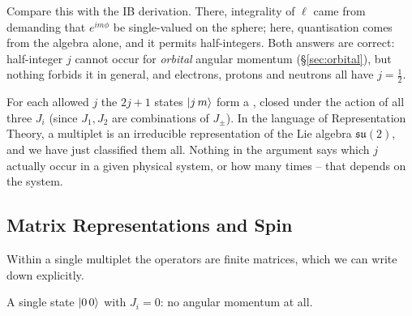 \documentclass[a4paper]{scrartcl}
\begin{document}
Compare this with the IB derivation. There, integrality of $\ell$ came from demanding that $e^{im\phi}$ be single-valued on the sphere; here, quantisation comes from the algebra alone, and it permits half-integers. Both answers are correct: half-integer $j$ cannot occur for \emph{orbital} angular momentum (\S\ref{sec:orbital}), but nothing forbids it in general, and electrons, protons and neutrons all have $j = \frac12$.

\begin{center}
\end{center}

For each allowed $j$ the $2j+1$ states $\ket{j\,m}$ form a , closed under the action of all three $J_i$ (since $J_1, J_2$ are combinations of $J_\pm$). In the language of Representation Theory, a multiplet is an irreducible representation of the Lie algebra $\mathfrak{su}(2)$, and we have just classified them all. Nothing in the argument says which $j$ actually occur in a given physical system, or how many times -- that depends on the system.

\subsection{Matrix Representations and Spin}

Within a single multiplet the operators are finite matrices, which we can write down explicitly.

\begin{example}[$j = 0$]
    A single state $\ket{0\,0}$ with $J_i = 0$: no angular momentum at all.
\end{example}
\end{document}
